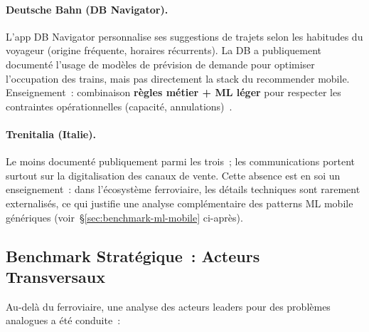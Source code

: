 \documentclass[12pt, a4paper]{report}
\begin{document}
\paragraph{Deutsche Bahn (DB Navigator).} L'app DB Navigator personnalise
ses suggestions de trajets selon les habitudes du voyageur (origine
fréquente, horaires récurrents). La DB a publiquement documenté
l'usage de modèles de prévision de demande pour optimiser l'occupation
des trains, mais pas directement la stack du recommender mobile.
Enseignement~: combinaison \textbf{règles métier + ML léger} pour
respecter les contraintes opérationnelles (capacité, annulations)~\cite{db-navigator}.

\paragraph{Trenitalia (Italie).} Le moins documenté publiquement parmi
les trois~; les communications portent surtout sur la digitalisation
des canaux de vente. Cette absence est en soi un enseignement~: dans
l'écosystème ferroviaire, les détails techniques sont rarement
externalisés, ce qui justifie une analyse complémentaire des patterns
ML mobile génériques (voir~\S\ref{sec:benchmark-ml-mobile} ci-après).

\subsection{Benchmark Stratégique~: Acteurs Transversaux}

Au-delà du ferroviaire, une analyse des acteurs leaders pour des
problèmes analogues a été conduite~:
\end{document}
